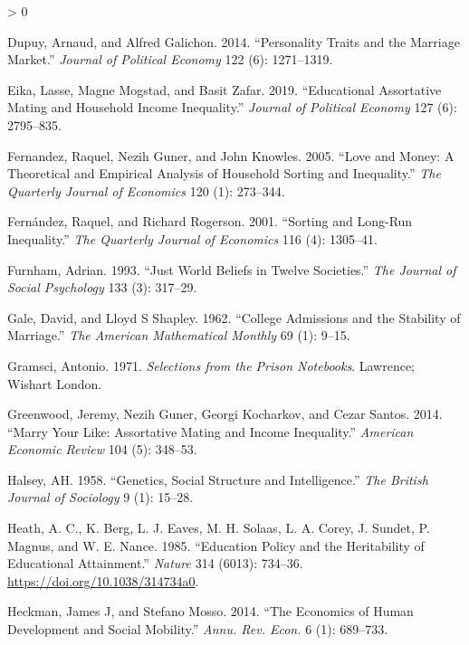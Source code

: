 \documentclass[
]{article}
\newlength{\cslhangindent}
\newenvironment{CSLReferences}[2] %
 {%
  \setlength{\parindent}{0pt}
  \ifodd #1 \everypar{\setlength{\hangindent}{\cslhangindent}}\ignorespaces\fi
  \ifnum #2 > 0
  \setlength{\parskip}{#2\baselineskip}
  \fi
 }%
 {}
\begin{document}
\begin{CSLReferences}{1}{0}
\leavevmode\hypertarget{ref-dupuy2014personality}{}%
Dupuy, Arnaud, and Alfred Galichon. 2014. {``Personality Traits and the Marriage Market.''} \emph{Journal of Political Economy} 122 (6): 1271--1319.

\leavevmode\hypertarget{ref-eika2019educational}{}%
Eika, Lasse, Magne Mogstad, and Basit Zafar. 2019. {``Educational Assortative Mating and Household Income Inequality.''} \emph{Journal of Political Economy} 127 (6): 2795--835.

\leavevmode\hypertarget{ref-fernandez2005love}{}%
Fernandez, Raquel, Nezih Guner, and John Knowles. 2005. {``Love and Money: A Theoretical and Empirical Analysis of Household Sorting and Inequality.''} \emph{The Quarterly Journal of Economics} 120 (1): 273--344.

\leavevmode\hypertarget{ref-fernandez2001sorting}{}%
Fernández, Raquel, and Richard Rogerson. 2001. {``Sorting and Long-Run Inequality.''} \emph{The Quarterly Journal of Economics} 116 (4): 1305--41.

\leavevmode\hypertarget{ref-furnham1993just}{}%
Furnham, Adrian. 1993. {``Just World Beliefs in Twelve Societies.''} \emph{The Journal of Social Psychology} 133 (3): 317--29.

\leavevmode\hypertarget{ref-gale1962college}{}%
Gale, David, and Lloyd S Shapley. 1962. {``College Admissions and the Stability of Marriage.''} \emph{The American Mathematical Monthly} 69 (1): 9--15.

\leavevmode\hypertarget{ref-gramsci1971selections}{}%
Gramsci, Antonio. 1971. \emph{Selections from the Prison Notebooks}. Lawrence; Wishart London.

\leavevmode\hypertarget{ref-greenwood2014marry}{}%
Greenwood, Jeremy, Nezih Guner, Georgi Kocharkov, and Cezar Santos. 2014. {``Marry Your Like: Assortative Mating and Income Inequality.''} \emph{American Economic Review} 104 (5): 348--53.

\leavevmode\hypertarget{ref-halsey1958genetics}{}%
Halsey, AH. 1958. {``Genetics, Social Structure and Intelligence.''} \emph{The British Journal of Sociology} 9 (1): 15--28.

\leavevmode\hypertarget{ref-Heath_1985}{}%
Heath, A. C., K. Berg, L. J. Eaves, M. H. Solaas, L. A. Corey, J. Sundet, P. Magnus, and W. E. Nance. 1985. {``Education Policy and the Heritability of Educational Attainment.''} \emph{Nature} 314 (6013): 734--36. \url{https://doi.org/10.1038/314734a0}.

\leavevmode\hypertarget{ref-heckman2014economics}{}%
Heckman, James J, and Stefano Mosso. 2014. {``The Economics of Human Development and Social Mobility.''} \emph{Annu. Rev. Econ.} 6 (1): 689--733.


\end{CSLReferences}
\end{document}
